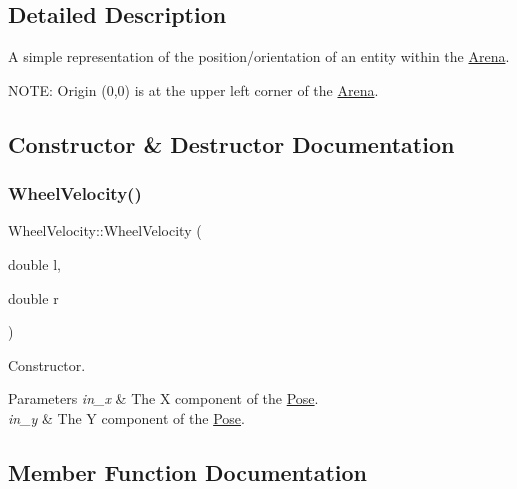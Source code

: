 \subsection{Detailed Description}
A simple representation of the position/orientation of an entity within the \mbox{\hyperlink{class_arena}{Arena}}. 

N\+O\+TE\+: Origin (0,0) is at the upper left corner of the \mbox{\hyperlink{class_arena}{Arena}}. 

\subsection{Constructor \& Destructor Documentation}
\mbox{\label{struct_wheel_velocity_a08a753191ddcffb83592d60e4e46be65}} 
\subsubsection{\texorpdfstring{Wheel\+Velocity()}{WheelVelocity()}}
{\footnotesize\ttfamily Wheel\+Velocity\+::\+Wheel\+Velocity (\begin{DoxyParamCaption}\item[{double}]{l,  }\item[{double}]{r }\end{DoxyParamCaption})\hspace{0.3cm}{\ttfamily [inline]}}



Constructor. 


\begin{DoxyParams}{Parameters}
{\em in\+\_\+x} & The X component of the \mbox{\hyperlink{struct_pose}{Pose}}. \\
\hline
{\em in\+\_\+y} & The Y component of the \mbox{\hyperlink{struct_pose}{Pose}}. \\
\hline
\end{DoxyParams}


\subsection{Member Function Documentation}
\mbox{\label{struct_wheel_velocity_a43eee436deaaa5fb6e0d747c2cc4d266}} 

